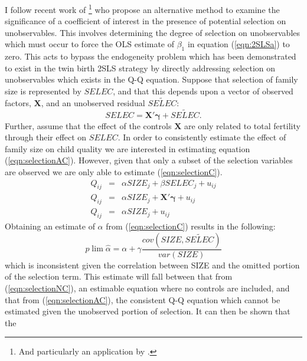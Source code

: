 \documentclass{article}[11pt,subeqn]
\newcommand{\vect}[1]{\mathbf{#1}}
\begin{document}
\begin{spacing}{1.5}
I follow recent work of \citet{Altonjietal2005, Altonjietal2008}\footnote{And particularly an application by \citet{BellowsMiguel2008}.} who propose an alternative method to examine the significance of a coefficient of interest in the presence of 
potential selection on unobservables.  This involves determining the degree of selection on unobservables which must occur to force the OLS estimate of $\beta_1$ in equation 
(\ref{eqn:2SLSa}) to zero.  This acts to bypass the endogeneity problem which has been demonstrated to exist in the twin birth 2SLS strategy by directly addressing selection on 
unobservables which exists in the Q-Q equation. Suppose that selection of family size is represented by $SELEC$, and that this depends upon a vector of observed factors, $\vect{X}$, and an unobserved residual $\widetilde{SELEC}$:  %
\begin{equation}
SELEC=\vect{X'\gamma}+ \widetilde{SELEC}.
\end{equation}
Further, assume that the effect of the controls $\vect{X}$ are only related to total fertility through their effect on $SELEC$.   In order to consistently estimate the effect of 
family size on child quality we are interested in estimating equation 
(\ref{eqn:selectionAC}).  However, given that only a subset of the selection variables are observed we are only able to estimate (\ref{eqn:selectionC}).
\begin{subequations}
\label{eqn:selection}
\begin{eqnarray}
Q_{ij}&=&\alpha SIZE_{j}+\beta SELEC_j+u_{ij} \label{eqn:selectionAC}\\
Q_{ij}&=&\alpha SIZE_{j}+\vect{X'\gamma}+u_{ij} \label{eqn:selectionC}\\
Q_{ij}&=&\alpha SIZE_{j}+u_{ij} \label{eqn:selectionNC}
\end{eqnarray}
\end{subequations}
Obtaining an estimate of $\alpha$ from (\ref{eqn:selectionC}) results in the following:
\begin{equation}
\label{eqn:biasC}
 p\lim \hat\alpha=\alpha + \gamma\frac{cov(SIZE,\widetilde{SELEC})}{var(SIZE)}
\end{equation}
which is inconsistent given the correlation between SIZE and the omitted portion of the selection term.  This estimate will fall between that from (\ref{eqn:selectionNC}), an estimable equation where
no controls are included, and that from (\ref{eqn:selectionAC}), the consistent Q-Q equation which cannot be estimated given the unobserved portion of selection.  It can then be shown that the

\end{spacing}
\end{document}
